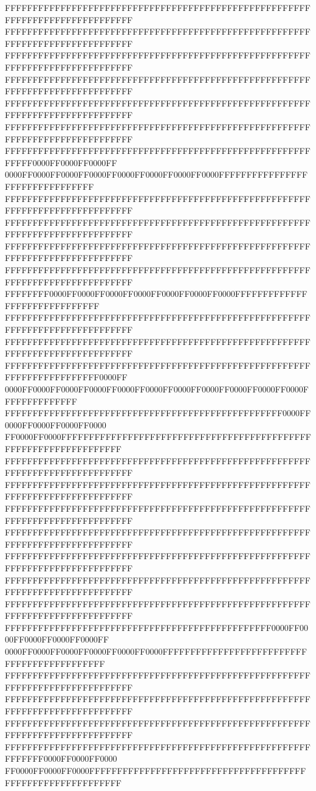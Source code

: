 FFFFFFFFFFFFFFFFFFFFFFFFFFFFFFFFFFFFFFFFFFFFFFFFFFFFFFFFFFFFFFFFFFFFFFFFFFFFFF
FFFFFFFFFFFFFFFFFFFFFFFFFFFFFFFFFFFFFFFFFFFFFFFFFFFFFFFFFFFFFFFFFFFFFFFFFFFFFF
FFFFFFFFFFFFFFFFFFFFFFFFFFFFFFFFFFFFFFFFFFFFFFFFFFFFFFFFFFFFFFFFFFFFFFFFFFFFFF
FFFFFFFFFFFFFFFFFFFFFFFFFFFFFFFFFFFFFFFFFFFFFFFFFFFFFFFFFFFFFFFFFFFFFFFFFFFFFF
FFFFFFFFFFFFFFFFFFFFFFFFFFFFFFFFFFFFFFFFFFFFFFFFFFFFFFFFFFFFFFFFFFFFFFFFFFFFFF
FFFFFFFFFFFFFFFFFFFFFFFFFFFFFFFFFFFFFFFFFFFFFFFFFFFFFFFFFFFFFFFFFFFFFFFFFFFFFF
FFFFFFFFFFFFFFFFFFFFFFFFFFFFFFFFFFFFFFFFFFFFFFFFFFFFFFFFFFFF0000FF0000FF0000FF
0000FF0000FF0000FF0000FF0000FF0000FF0000FF0000FFFFFFFFFFFFFFFFFFFFFFFFFFFFFFFF
FFFFFFFFFFFFFFFFFFFFFFFFFFFFFFFFFFFFFFFFFFFFFFFFFFFFFFFFFFFFFFFFFFFFFFFFFFFFFF
FFFFFFFFFFFFFFFFFFFFFFFFFFFFFFFFFFFFFFFFFFFFFFFFFFFFFFFFFFFFFFFFFFFFFFFFFFFFFF
FFFFFFFFFFFFFFFFFFFFFFFFFFFFFFFFFFFFFFFFFFFFFFFFFFFFFFFFFFFFFFFFFFFFFFFFFFFFFF
FFFFFFFFFFFFFFFFFFFFFFFFFFFFFFFFFFFFFFFFFFFFFFFFFFFFFFFFFFFFFFFFFFFFFFFFFFFFFF
FFFFFFFF0000FF0000FF0000FF0000FF0000FF0000FF0000FFFFFFFFFFFFFFFFFFFFFFFFFFFFFF
FFFFFFFFFFFFFFFFFFFFFFFFFFFFFFFFFFFFFFFFFFFFFFFFFFFFFFFFFFFFFFFFFFFFFFFFFFFFFF
FFFFFFFFFFFFFFFFFFFFFFFFFFFFFFFFFFFFFFFFFFFFFFFFFFFFFFFFFFFFFFFFFFFFFFFFFFFFFF
FFFFFFFFFFFFFFFFFFFFFFFFFFFFFFFFFFFFFFFFFFFFFFFFFFFFFFFFFFFFFFFFFFFFFFFF0000FF
0000FF0000FF0000FF0000FF0000FF0000FF0000FF0000FF0000FF0000FF0000FFFFFFFFFFFFFF
FFFFFFFFFFFFFFFFFFFFFFFFFFFFFFFFFFFFFFFFFFFFFFFFFF0000FF0000FF0000FF0000FF0000
FF0000FF0000FFFFFFFFFFFFFFFFFFFFFFFFFFFFFFFFFFFFFFFFFFFFFFFFFFFFFFFFFFFFFFFFFF
FFFFFFFFFFFFFFFFFFFFFFFFFFFFFFFFFFFFFFFFFFFFFFFFFFFFFFFFFFFFFFFFFFFFFFFFFFFFFF
FFFFFFFFFFFFFFFFFFFFFFFFFFFFFFFFFFFFFFFFFFFFFFFFFFFFFFFFFFFFFFFFFFFFFFFFFFFFFF
FFFFFFFFFFFFFFFFFFFFFFFFFFFFFFFFFFFFFFFFFFFFFFFFFFFFFFFFFFFFFFFFFFFFFFFFFFFFFF
FFFFFFFFFFFFFFFFFFFFFFFFFFFFFFFFFFFFFFFFFFFFFFFFFFFFFFFFFFFFFFFFFFFFFFFFFFFFFF
FFFFFFFFFFFFFFFFFFFFFFFFFFFFFFFFFFFFFFFFFFFFFFFFFFFFFFFFFFFFFFFFFFFFFFFFFFFFFF
FFFFFFFFFFFFFFFFFFFFFFFFFFFFFFFFFFFFFFFFFFFFFFFFFFFFFFFFFFFFFFFFFFFFFFFFFFFFFF
FFFFFFFFFFFFFFFFFFFFFFFFFFFFFFFFFFFFFFFFFFFFFFFFFFFFFFFFFFFFFFFFFFFFFFFFFFFFFF
FFFFFFFFFFFFFFFFFFFFFFFFFFFFFFFFFFFFFFFFFFFFFFFF0000FF0000FF0000FF0000FF0000FF
0000FF0000FF0000FF0000FF0000FF0000FFFFFFFFFFFFFFFFFFFFFFFFFFFFFFFFFFFFFFFFFFFF
FFFFFFFFFFFFFFFFFFFFFFFFFFFFFFFFFFFFFFFFFFFFFFFFFFFFFFFFFFFFFFFFFFFFFFFFFFFFFF
FFFFFFFFFFFFFFFFFFFFFFFFFFFFFFFFFFFFFFFFFFFFFFFFFFFFFFFFFFFFFFFFFFFFFFFFFFFFFF
FFFFFFFFFFFFFFFFFFFFFFFFFFFFFFFFFFFFFFFFFFFFFFFFFFFFFFFFFFFFFFFFFFFFFFFFFFFFFF
FFFFFFFFFFFFFFFFFFFFFFFFFFFFFFFFFFFFFFFFFFFFFFFFFFFFFFFFFFFFFF0000FF0000FF0000
FF0000FF0000FF0000FFFFFFFFFFFFFFFFFFFFFFFFFFFFFFFFFFFFFFFFFFFFFFFFFFFFFFFFFFFF
